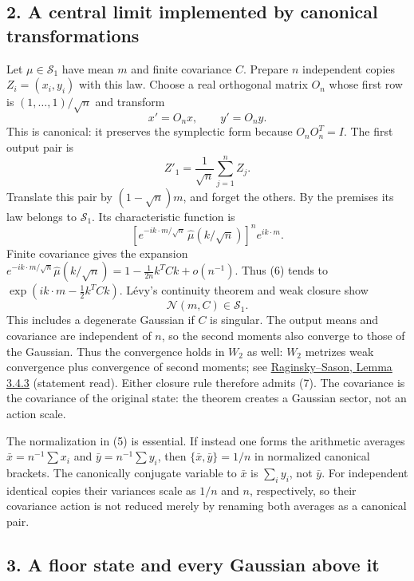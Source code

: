 \documentclass[11pt,a4paper]{article}
\begin{document}
\hypertarget{a-central-limit-implemented-by-canonical-transformations}{%
\subsection{2. A central limit implemented by canonical
transformations}\label{a-central-limit-implemented-by-canonical-transformations}}

Let \(\mu\in\mathcal S_1\) have mean \(m\) and finite covariance \(C\).
Prepare \(n\) independent copies \(Z_i=(x_i,y_i)\) with this law. Choose
a real orthogonal matrix \(O_n\) whose first row is
\((1,\ldots,1)/\sqrt n\) and transform
\[x'=O_n x,\qquad y'=O_n y.\tag{4}\] This is canonical: it preserves the
symplectic form because \(O_nO_n^T=I\). The first output pair is
\[Z'_1=\frac1{\sqrt n}\sum_{j=1}^n Z_j.\tag{5}\] Translate this pair by
\((1-\sqrt n)m\), and forget the others. By the premises its law belongs
to \(\mathcal S_1\). Its characteristic function is \[
 \left[e^{-ik\cdot m/\sqrt n}\,
       \widehat\mu(k/\sqrt n)\right]^n e^{ik\cdot m}.\tag{6}
\] Finite covariance gives the expansion
\(e^{-ik\cdot m/\sqrt n}\widehat\mu(k/\sqrt n)  =1-\frac1{2n}k^TCk+o(n^{-1})\).
Thus (6) tends to \(\exp(ik\cdot m-\frac12k^TCk)\). Lévy's continuity
theorem and weak closure show
\[\boxed{\mathcal N(m,C)\in\mathcal S_1.}\tag{7}\] This includes a
degenerate Gaussian if \(C\) is singular. The output means and
covariance are independent of \(n\), so the second moments also converge
to those of the Gaussian. Thus the convergence holds in \(W_2\) as well:
\(W_2\) metrizes weak convergence plus convergence of second moments;
see
\href{https://webee.technion.ac.il/people/sason/Raginsky_Sason.pdf}{Raginsky--Sason,
Lemma 3.4.3} (statement read). Either closure rule therefore admits (7).
The covariance is the covariance of the original state: the theorem
creates a Gaussian sector, not an action scale.

The normalization in (5) is essential. If instead one forms the
arithmetic averages \(\bar x=n^{-1}\sum x_i\) and
\(\bar y=n^{-1}\sum y_i\), then \(\{\bar x,\bar y\}=1/n\) in normalized
canonical brackets. The canonically conjugate variable to \(\bar x\) is
\(\sum_i y_i\), not \(\bar y\). For independent identical copies their
variances scale as \(1/n\) and \(n\), respectively, so their covariance
action is not reduced merely by renaming both averages as a canonical
pair.

\hypertarget{a-floor-state-and-every-gaussian-above-it}{%
\subsection{3. A floor state and every Gaussian above
it}\label{a-floor-state-and-every-gaussian-above-it}}
\end{document}
